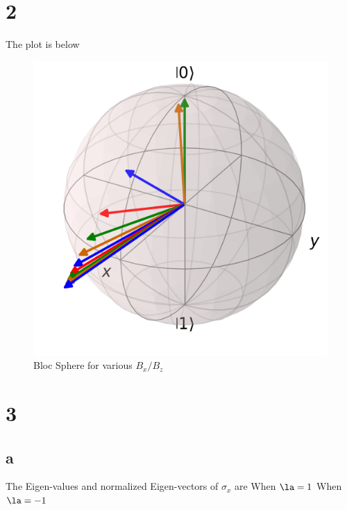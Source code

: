 \section*{2}
The plot is below
\begin{figure}[h]
    \centering
    \includegraphics[width=0.75\linewidth]{Resources//245//Homework 2/245 Homework 2 Problem 2.png}
    \caption{Bloc Sphere for various $B_x/B_z$}
    \label{fig:enter-label}
\end{figure}
\section*{3}
\subsection*{a}
The Eigen-values and normalized Eigen-vectors of $\sigma_x$ are
When $\la = 1$
When $\la = -1$
